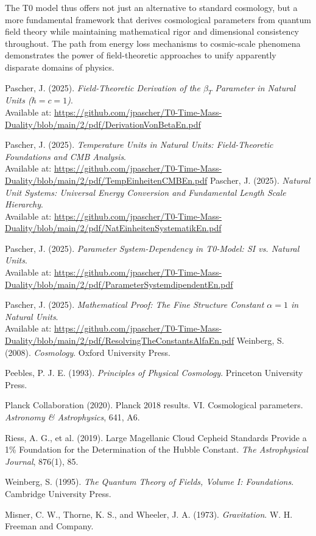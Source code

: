 \documentclass[12pt,a4paper]{article}
\begin{document}
	The T0 model thus offers not just an alternative to standard cosmology, but a more fundamental framework that derives cosmological parameters from quantum field theory while maintaining mathematical rigor and dimensional consistency throughout. The path from energy loss mechanisms to cosmic-scale phenomena demonstrates the power of field-theoretic approaches to unify apparently disparate domains of physics.
	
	\begin{thebibliography}{99}
		Pascher, J. (2025). \textit{Field-Theoretic Derivation of the $\beta_T$ Parameter in Natural Units ($\hbar = c = 1$)}. \\
		Available at: \url{https://github.com/jpascher/T0-Time-Mass-Duality/blob/main/2/pdf/DerivationVonBetaEn.pdf}
		
		Pascher, J. (2025). \textit{Temperature Units in Natural Units: Field-Theoretic Foundations and CMB Analysis}. \\
		Available at: \url{https://github.com/jpascher/T0-Time-Mass-Duality/blob/main/2/pdf/TempEinheitenCMBEn.pdf}
		Pascher, J. (2025). \textit{Natural Unit Systems: Universal Energy Conversion and Fundamental Length Scale Hierarchy}. \\
		Available at: \url{https://github.com/jpascher/T0-Time-Mass-Duality/blob/main/2/pdf/NatEinheitenSystematikEn.pdf}
		
		Pascher, J. (2025). \textit{Parameter System-Dependency in T0-Model: SI vs. Natural Units}. \\
		Available at: \url{https://github.com/jpascher/T0-Time-Mass-Duality/blob/main/2/pdf/ParameterSystemdipendentEn.pdf}
		
		Pascher, J. (2025). \textit{Mathematical Proof: The Fine Structure Constant $\alpha = 1$ in Natural Units}. \\
		Available at: \url{https://github.com/jpascher/T0-Time-Mass-Duality/blob/main/2/pdf/ResolvingTheConstantsAlfaEn.pdf}
		Weinberg, S. (2008). \textit{Cosmology}. Oxford University Press.
		
		Peebles, P. J. E. (1993). \textit{Principles of Physical Cosmology}. Princeton University Press.
		
		Planck Collaboration (2020). Planck 2018 results. VI. Cosmological parameters. \textit{Astronomy \& Astrophysics}, 641, A6.
		
		Riess, A. G., et al. (2019). Large Magellanic Cloud Cepheid Standards Provide a 1\% Foundation for the Determination of the Hubble Constant. \textit{The Astrophysical Journal}, 876(1), 85.
		
		Weinberg, S. (1995). \textit{The Quantum Theory of Fields, Volume I: Foundations}. Cambridge University Press.
		
		Misner, C. W., Thorne, K. S., and Wheeler, J. A. (1973). \textit{Gravitation}. W. H. Freeman and Company.
	\end{thebibliography}
	
\end{document}
